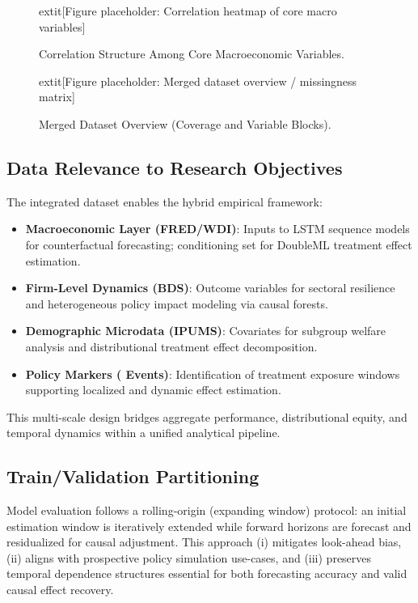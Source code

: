 \begin{figure}[htbp]
  \centering
  	extit{[Figure placeholder: Correlation heatmap of core macro variables]} 
  \caption{Correlation Structure Among Core Macroeconomic Variables.}\label{fig:correlation_heatmap}
\end{figure}

\begin{figure}[htbp]
  \centering
  	extit{[Figure placeholder: Merged dataset overview / missingness matrix]} 
  \caption{Merged Dataset Overview (Coverage and Variable Blocks).}\label{fig:merged_overview}
\end{figure}

\subsection{Data Relevance to Research Objectives}\label{subsec:data_relevance}
The integrated dataset enables the hybrid empirical framework:
\begin{itemize}
  \item \textbf{Macroeconomic Layer (FRED/WDI)}: Inputs to LSTM sequence models for counterfactual forecasting; conditioning set for DoubleML treatment effect estimation.
  \item \textbf{Firm-Level Dynamics (BDS)}: Outcome variables for sectoral resilience and heterogeneous policy impact modeling via causal forests.
  \item \textbf{Demographic Microdata (IPUMS)}: Covariates for subgroup welfare analysis and distributional treatment effect decomposition.
  \item \textbf{Policy Markers (\VAT{} Events)}: Identification of treatment exposure windows supporting localized and dynamic effect estimation.
\end{itemize}
This multi-scale design bridges aggregate performance, distributional equity, and temporal dynamics within a unified analytical pipeline.

\subsection{Train/Validation Partitioning}\label{subsec:partitioning}
Model evaluation follows a rolling-origin (expanding window) protocol: an initial estimation window is iteratively extended while forward horizons are forecast and residualized for causal adjustment. This approach (i) mitigates look-ahead bias, (ii) aligns with prospective policy simulation use-cases, and (iii) preserves temporal dependence structures essential for both forecasting accuracy and valid causal effect recovery.

